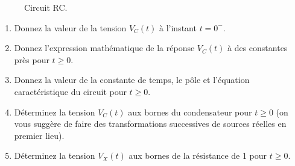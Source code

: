 \documentclass[12pt,titlepage]{article}
\begin{document}
{\begin{figure}[h!]
{}
		\caption{Circuit RC.}
	\end{figure}
	\begin{enumerate}
		\item Donnez la valeur de la tension $V_C(t)$ à l'instant $t=0^-$.
		\item Donnez l'expression mathématique de la réponse $V_C(t)$ à des constantes près pour $t\ge0$.
		\item Donnez la valeur de la constante de temps, le pôle et l'équation caractéristique du circuit pour $t\ge0$.
		\item Déterminez la tension $V_C(t)$ aux bornes du condensateur pour $t\ge0$ (on vous suggère de faire des transformations successives de sources réelles en premier lieu).
		\item Déterminez la tension $V_X(t)$ aux bornes de la résistance de \qty{1}{\Omega} pour $t\ge0$.
	\end{enumerate}}
\end{document}
